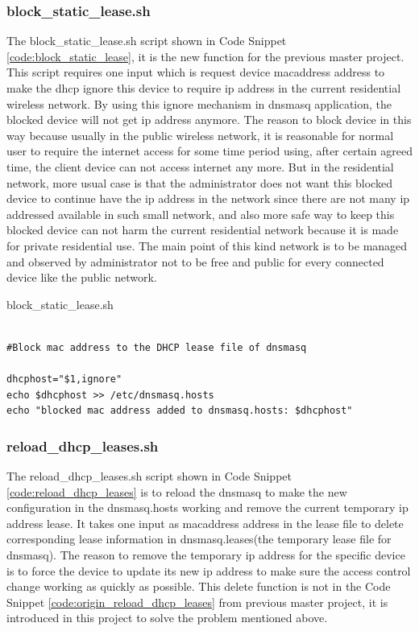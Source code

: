 \subsubsection{block\_static\_lease.sh}
\par The block\_static\_lease.sh script shown in Code Snippet \ref{code:block_static_lease}, it is the new function for the previous master project. This script requires one input which is request device \gls{macaddress} address to make the \gls{dhcp} ignore this device to require \gls{ip} address in the current residential wireless network. By using this ignore mechanism in dnsmasq application, the blocked device will not get \gls{ip} address anymore. The reason to block device in this way because usually in the public wireless network, it is reasonable for normal user to require the internet access for some time period using, after certain agreed time, the client device can not access internet any more. But in the residential network, more usual case is that the administrator does not want this blocked device to continue have the \gls{ip} address in the network since there are not many \gls{ip} addressed available in such small network, and also more safe way to keep this blocked device can not harm the current residential network because it is made for private residential use. The main point of this kind network is to be managed and observed by administrator not to be free and public for every connected device like the public network.

\begin{algorithm}[h]
  \caption{block\_static\_lease.sh}
  \label{code:block_static_lease}
  \begin{verbatim}
  
#Block mac address to the DHCP lease file of dnsmasq
        
dhcphost="$1,ignore"
echo $dhcphost >> /etc/dnsmasq.hosts
echo "blocked mac address added to dnsmasq.hosts: $dhcphost"
 \end{verbatim}
\end{algorithm}

\subsubsection{reload\_dhcp\_leases.sh}
\par The reload\_dhcp\_leases.sh script shown in Code Snippet \ref{code:reload_dhcp_leases} is to reload the dnsmasq to make the new configuration in the dnsmasq.hosts working and remove the current temporary \gls{ip} address lease. It takes one input as \gls{macaddress} address in the lease file to delete corresponding lease information in dnsmasq.leases(the temporary lease file for dnsmasq). The reason to remove the temporary \gls{ip} address for the specific device is to force the device to update its new \gls{ip} address to make sure the access control change working as quickly as possible. This delete function is not in the Code Snippet \ref{code:origin_reload_dhcp_leases} from previous master project, it is introduced in this project to solve the problem mentioned above.

